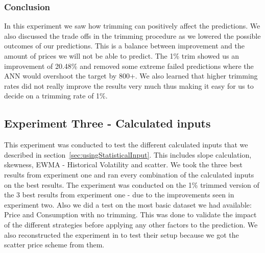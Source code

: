 \begin{table}[H]
\centering  %
\caption{Trims} %
\label{table:Top10Trimming} %
\end{table}



\subsubsection{Conclusion}
In this experiment we saw how trimming can positively affect the predictions. We also discussed the trade offs in the trimming procedure as we lowered the possible outcomes of our predictions. This is a balance between improvement and the amount of prices we will not be able to predict. The 1\% trim showed us an improvement of 20.48\% and removed some extreme failed predictions where the ANN would overshoot the target by 800+. We also learned that higher trimming rates did not really improve the results very much thus making it easy for us to decide on a trimming rate of 1\%.

\newpage
\subsection{Experiment Three - Calculated inputs}
\label{sec:priceExperimentThree}
This experiment was conducted to test the different calculated inputs that we described in section~\ref{sec:usingStatisticalInput}. This includes slope calculation, skewness, EWMA - Historical Volatility and scatter. We took the three best results from experiment one and ran every combination of the calculated inputs on the best results. The experiment was conducted on the 1\% trimmed version of the 3 best results from experiment one - due to the improvements seen in experiment two. Also we did a test on the most basic dataset we had available: Price and Consumption with no trimming. This was done to validate the impact of the different strategies before applying any other factors to the prediction. We also reconstructed the experiment in \cite{singhal2011electricity} to test their setup because we got the scatter price scheme from them.

